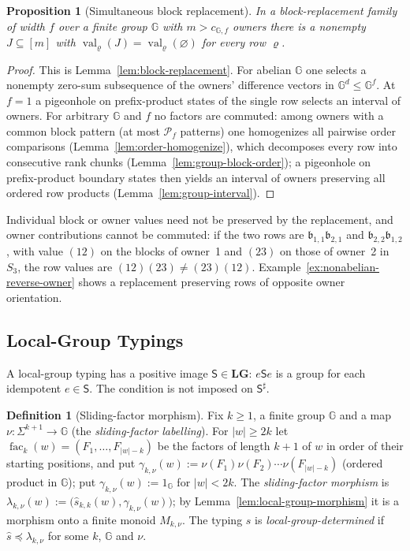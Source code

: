 \documentclass[11pt]{article}
\numberwithin{equation}{section}
\theoremstyle{plain}
\newtheorem{proposition}[theorem]{Proposition}
\theoremstyle{definition}
\newtheorem{definition}[theorem]{Definition}
\theoremstyle{remark}
\theoremstyle{plain}
\begin{document}
\begin{proposition}[Simultaneous block replacement]
\label{prop:block-replacement-interface}
In a block-replacement family of width $f$ over a finite group ${\mathbb G}$ with
$m>c_{{\mathbb G},f}$ owners there is a nonempty $J\subseteq[m]$ with
$\operatorname{val}_\varrho(J)=\operatorname{val}_\varrho(\varnothing)$ for every row $\varrho$.
\end{proposition}

\begin{proof}
This is Lemma~\ref{lem:block-replacement}.  For abelian ${\mathbb G}$ one selects a
nonempty zero-sum subsequence of the owners' difference vectors in
${\mathbb G}^d\le {\mathbb G}^f$.  At $f=1$ a pigeonhole on prefix-product states of the single row
selects an interval of owners.  For arbitrary ${\mathbb G}$ and $f$ no factors are commuted: among owners with a
common block pattern (at most $\mathcal P_f$ patterns) one homogenizes all pairwise order
comparisons (Lemma~\ref{lem:order-homogenize}), which decomposes every row into
consecutive rank chunks (Lemma~\ref{lem:group-block-order}); a pigeonhole on
prefix-product boundary states then yields an interval of owners preserving all
ordered row products (Lemma~\ref{lem:group-interval}).
\end{proof}

Individual block or owner values need not be preserved by the replacement, and
owner contributions cannot be commuted: if the two rows are
$\mathfrak b_{1,1}\mathfrak b_{2,1}$ and $\mathfrak b_{2,2}\mathfrak b_{1,2}$, with value $(12)$ on the
blocks of owner~1 and $(23)$ on those of owner~2 in $S_3$, the row values are
$(12)(23)\ne(23)(12)$.
Example~\ref{ex:nonabelian-reverse-owner} shows a replacement preserving rows of
opposite owner orientation.

\subsection{Local-Group Typings}
\label{subsec:algebraic-typed-data}
A local-group typing has a positive image $\mathsf S\in\mathbf{LG}$:
$e\mathsf Se$ is a group for each idempotent $e\in\mathsf S$.
The condition is not imposed on $\mathsf S^\sharp$.

\begin{definition}[Sliding-factor morphism]
\label{def:local-group-typing}
Fix $k\ge1$, a finite group ${\mathbb G}$ and a map $\nu:\Sigma^{k+1}\to {\mathbb G}$ (the
\emph{sliding-factor labelling}).  For $|w|\ge2k$ let
$\operatorname{fac}_k(w)=(F_1,\ldots,F_{|w|-k})$ be the factors of length $k+1$ of $w$ in
order of their starting positions, and put
$\gamma_{k,\nu}(w):=\nu(F_1)\nu(F_2)\cdots\nu(F_{|w|-k})$ (ordered product in
${\mathbb G}$); put $\gamma_{k,\nu}(w):=1_{\mathbb G}$ for $|w|<2k$.  The \emph{sliding-factor
morphism} is $\lambda_{k,\nu}(w):=\bigl(\widehat s_{k,k}(w),\gamma_{k,\nu}(w)\bigr)$; by
Lemma~\ref{lem:local-group-morphism} it is a morphism onto a finite monoid
$M_{k,\nu}$.  The typing $s$ is \emph{local-group-determined} if
$\widehat s\preceq\lambda_{k,\nu}$ for some $k$, ${\mathbb G}$ and $\nu$.
\end{definition}
\end{document}
